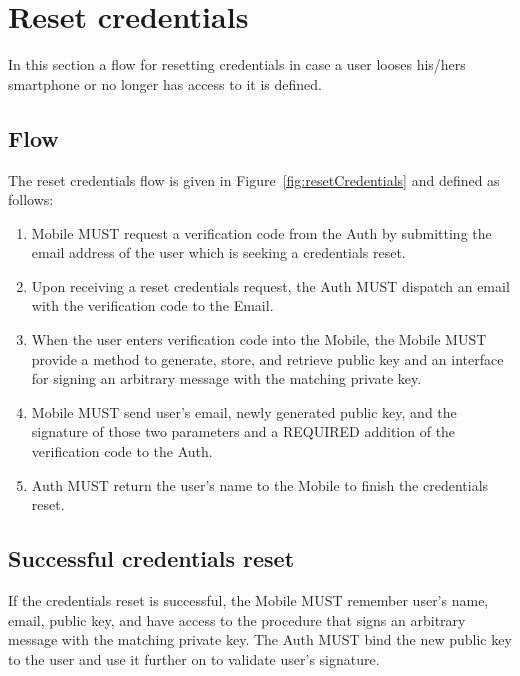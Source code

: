 \section{Reset credentials}
In this section a flow for resetting credentials in case a user looses his/hers
smartphone or no longer has access to it is defined. 

    \subsection{Flow}
    The reset credentials flow is given in Figure~\ref{fig:resetCredentials} and defined as follows:
        \begin{enumerate}
            \item Mobile MUST request a verification code from the Auth by submitting the email address of the user
                  which is seeking a credentials reset.
            \item Upon receiving a reset credentials request, the Auth MUST dispatch an email with the verification
                  code to the Email.
            \item When the user enters verification code into the Mobile, the Mobile MUST provide a method to generate,
                  store, and retrieve public key and an interface for signing an arbitrary message with the matching 
                  private key.
            \item Mobile MUST send user's email, newly generated public key, and the signature of those two parameters
                  and a REQUIRED addition of the verification code to the Auth.
            \item Auth MUST return the user's name to the Mobile to finish the credentials reset.
        \end{enumerate}
        

    \subsection{Successful credentials reset}
    If the credentials reset is successful, the Mobile MUST remember user's name, email, public key, and 
    have access to the procedure that signs an arbitrary message with the matching private key. The Auth MUST 
    bind the new public key to the user and use it further on to validate user's signature.

